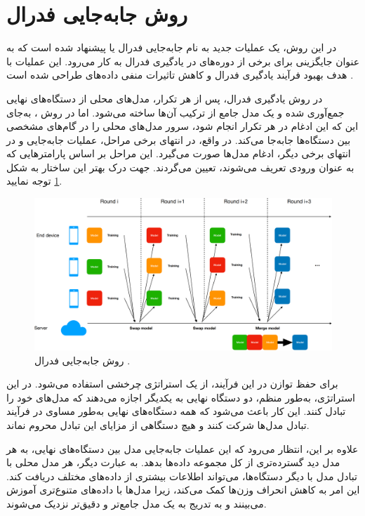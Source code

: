 \section{
	روش جابه‌جایی فدرال%
}
در این روش، یک عملیات جدید به نام جابه‌جایی فدرال یا
پیشنهاد شده است که به عنوان جایگزینی برای برخی از دوره‌های
در یادگیری فدرال به کار می‌رود.
این عملیات با هدف بهبود فرآیند یادگیری فدرال و کاهش تاثیرات منفی داده‌های
طراحی شده است
\cite{chiu2020semisupervised}.


در روش‌ یادگیری فدرال، پس از هر تکرار، مدل‌های محلی از دستگاه‌های نهایی جمع‌آوری شده و یک مدل جامع از ترکیب آن‌ها ساخته می‌شود. اما در روش
%
، به‌جای این که این ادغام در هر تکرار انجام شود، سرور مدل‌های محلی را در گام‌های مشخصی بین دستگاه‌ها جابه‌جا می‌کند. در واقع، در انتهای برخی مراحل، عملیات جابه‌جایی و در انتهای برخی دیگر، ادغام مدل‌ها صورت می‌گیرد. این مراحل بر اساس پارامترهایی که به عنوان ورودی تعریف می‌شوند، تعیین می‌گردند.
جهت درک بهتر این ساختار به شکل
\ref{federated_swapping}
توجه نمایید.


\begin{figure}[b!]
	\centering
	\includegraphics[scale=0.179]{images/chap4/federated_swapping.png}%
	\caption{%
		روش جابه‌جایی فدرال
		\cite{chiu2020semisupervised}%
		.
	}
	\label{federated_swapping}
	\centering
\end{figure}


برای حفظ توازن در این فرآیند، از یک استراتژی چرخشی%
استفاده می‌شود. در این استراتژی، به‌طور منظم، دو دستگاه نهایی به یکدیگر اجازه می‌دهند که مدل‌های خود را تبادل کنند. این کار باعث می‌شود که همه دستگاه‌های نهایی به‌طور مساوی در فرآیند تبادل مدل‌ها شرکت کنند و هیچ دستگاهی از مزایای این تبادل محروم نماند.

علاوه بر این، انتظار می‌رود که این عملیات جابه‌جایی مدل بین دستگاه‌های نهایی، به هر مدل دید گسترده‌تری از کل مجموعه داده‌ها بدهد. به عبارت دیگر، هر مدل محلی با تبادل مدل با دیگر دستگاه‌ها، می‌تواند اطلاعات بیشتری از داده‌های مختلف دریافت کند. این امر به کاهش انحراف وزن‌ها کمک می‌کند، زیرا مدل‌ها با داده‌های متنوع‌تری آموزش می‌بینند و به تدریج به یک مدل جامع‌تر و دقیق‌تر نزدیک می‌شوند.

